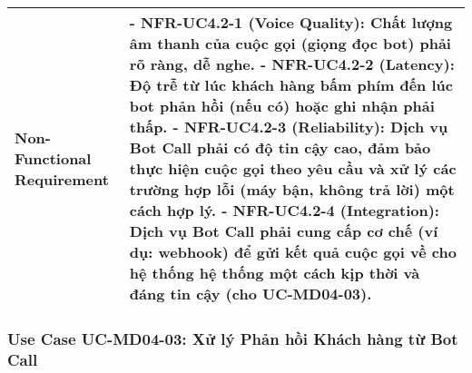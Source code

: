 \begin{longtable}{|m{4cm}|p{11cm}|}
\hline
Non-Functional Requirement & - \textbf{NFR-UC4.2-1 (Voice Quality):} Chất lượng âm thanh của cuộc gọi (giọng đọc bot) phải rõ ràng, dễ nghe. \newline - \textbf{NFR-UC4.2-2 (Latency):} Độ trễ từ lúc khách hàng bấm phím đến lúc bot phản hồi (nếu có) hoặc ghi nhận phải thấp. \newline - \textbf{NFR-UC4.2-3 (Reliability):} Dịch vụ Bot Call phải có độ tin cậy cao, đảm bảo thực hiện cuộc gọi theo yêu cầu và xử lý các trường hợp lỗi (máy bận, không trả lời) một cách hợp lý. \newline - \textbf{NFR-UC4.2-4 (Integration):} Dịch vụ Bot Call phải cung cấp cơ chế (ví dụ: webhook) để gửi kết quả cuộc gọi về cho hệ thống hệ thống một cách kịp thời và đáng tin cậy (cho UC-MD04-03). \\
\hline
\end{longtable}

\subsubsection{Use Case UC-MD04-03: Xử lý Phản hồi Khách hàng từ Bot Call}

